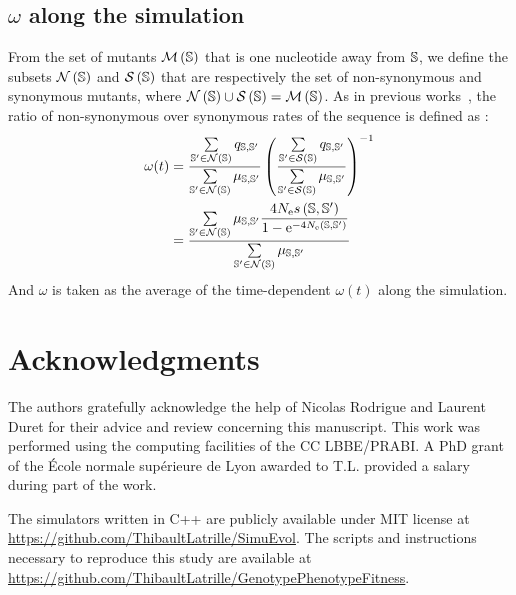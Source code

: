 \subsection{\texorpdfstring{$\omega$}{ω} along the simulation}
From the set of mutants $\mathcal{M}\left(\mathbb{S}\right)$ that is one nucleotide away from $\mathbb{S}$, we define the subsets $\mathcal{N}\left(\mathbb{S}\right)$ and $\mathcal{S}\left(\mathbb{S}\right)$ that are respectively the set of non-synonymous and synonymous mutants, where $\mathcal{N}\left(\mathbb{S}\right) \cup \mathcal{S}\left(\mathbb{S}\right) = \mathcal{M}\left(\mathbb{S}\right)$.
As in previous works~\citep{Spielman2015, DosReis2015, Jones2016}, the ratio of non-synonymous over \gls{synonymous} rates of the sequence is defined as :
\begin{align}
\omega(t) &= \dfrac{\sum\limits_{\mathbb{S}' \in \mathcal{N}\left(\mathbb{S}\right)} q_{\mathbb{S}, \mathbb{S}'}}{\sum\limits_{\mathbb{S}' \in \mathcal{N}\left(\mathbb{S}\right)} \mu_{\mathbb{S}, \mathbb{S}'}} \left( \dfrac{\sum\limits_{\mathbb{S}' \in \mathcal{S}\left(\mathbb{S}\right)} q_{\mathbb{S}, \mathbb{S}'}}{\sum\limits_{\mathbb{S}' \in \mathcal{S}\left(\mathbb{S}\right)} \mu_{\mathbb{S}, \mathbb{S}'}} \right)^{-1}\\
&= \dfrac{\sum\limits_{\mathbb{S}' \in \mathcal{N}\left(\mathbb{S}\right)} \mu_{\mathbb{S}, \mathbb{S}'} \dfrac{4 N_{\mathrm{e}} s \left( \mathbb{S},\mathbb{S}'\right)}{{1 - \mathrm{e}^{-4 N_{\mathrm{e}} \left( \mathbb{S},\mathbb{S}'\right)} }}}{\sum\limits_{\mathbb{S}' \in \mathcal{N}\left(\mathbb{S}\right)} \mu_{\mathbb{S}, \mathbb{S}'}}
\end{align}
And $\omega$ is taken as the average of the time-dependent $\omega(t)$ along the simulation.

\section{Acknowledgments}

The authors gratefully acknowledge the help of Nicolas Rodrigue and Laurent Duret for their advice and review concerning this manuscript.
This work was performed using the computing facilities of the CC LBBE/PRABI.
A PhD grant of the École normale supérieure de Lyon awarded to T.L. provided a salary during part of the work.

The simulators written in C++ are publicly available under MIT license at \url{https://github.com/ThibaultLatrille/SimuEvol}.
The scripts and instructions necessary to reproduce this study are available at \url{https://github.com/ThibaultLatrille/GenotypePhenotypeFitness}.

